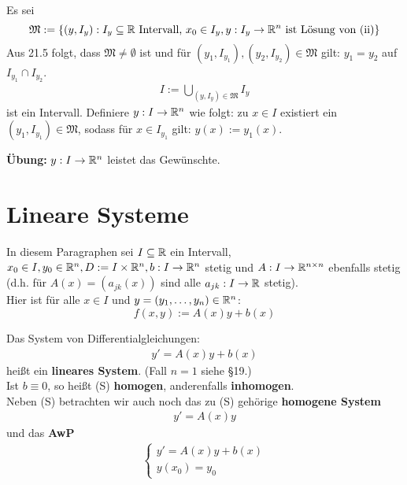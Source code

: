 \documentclass[a4paper,twoside,DIV15,BCOR12mm,chapterprefix=true,headings=twolinechapter]{scrbook}
\begin{document}
\begin{beweis}
Es sei
\[\mathfrak{M} := \{ (y,I_y) : I_y \subseteq \mathbb{R} \text{ Intervall, } 
x_0 \in I_y, y: I_y \to \mathbb{R}^n \text{ ist Lösung von (ii)} \}\]
Aus 21.5 folgt, dass $\mathfrak{M} \ne \emptyset$ ist und für 
$(y_1, I_{y_1}), (y_2, I_{y_2}) \in \mathfrak{M}$ gilt: $y_1 = y_2$ auf 
$I_{y_1} \cap I_{y_2}$.
\begin{align*}
I := \bigcup_{(y, I_y) \in \mathfrak{M}} I_y
\end{align*} 
ist ein Intervall. Definiere $y: I \to \mathbb{R}^n$ wie folgt: zu $x \in I$ existiert 
ein $(y_1, I_{y_1}) \in \mathfrak{M}$, sodass für $x \in I_{y_1}$ gilt: $y(x) := y_1(x)$.

\textbf{Übung:} $y: I \to \mathbb{R}^n$ leistet das Gewünschte.
\end{beweis}

\chapter{Lineare Systeme}
In diesem Paragraphen sei $I\subseteq\mathbb{R}$ ein Intervall, $x_0\in I, y_0\in\mathbb{R}^n,
D:=I\times\mathbb{R}^n,b:I\to\mathbb{R}^n$ stetig und $A:I\to\mathbb{R}^{n\times n}$ ebenfalls stetig 
(d.h. für $A(x)=(a_{jk}(x))$ sind alle $a_{jk}:I\to\mathbb{R}$ stetig).\\
Hier ist für alle $x\in I$ und $y=(y_1,\ldots,y_n)\in\mathbb{R}^n$:
\[f(x,y):=A(x)y+b(x)\]

\begin{definition}
Das System von Differentialgleichungen:
\begin{align*}
y'=A(x)y+b(x)\tag{S}
\end{align*}
heißt ein \textbf{lineares System}. (Fall $n=1$ siehe §19.)\\
Ist $b\equiv 0$, so heißt (S) \textbf{homogen}, anderenfalls \textbf{inhomogen}.\\
Neben (S) betrachten wir auch noch das zu (S) gehörige \textbf{homogene System}
\begin{align*}
y'=A(x)y\tag{H}
\end{align*}
und das \textbf{AwP}
\begin{align*}
\tag{A}
\begin{cases}
y'=A(x)y+b(x)\\
y(x_0)=y_0
\end{cases}
\end{align*}
\end{definition}
\end{document}
